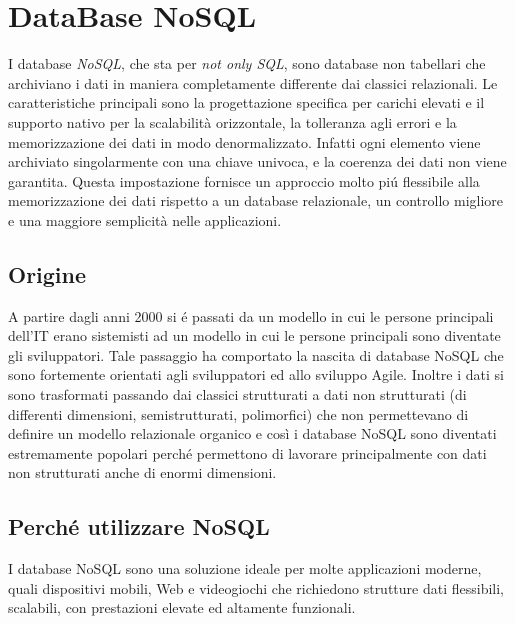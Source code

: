 \chapter{DataBase NoSQL}
I database \emph{NoSQL}, che sta per \emph{not only SQL}, sono database non tabellari che archiviano i dati
in maniera completamente differente dai classici relazionali.
Le caratteristiche principali sono la progettazione specifica per carichi elevati e il supporto nativo per la scalabilità
orizzontale, la tolleranza agli errori e la memorizzazione dei dati in modo denormalizzato.
Infatti ogni elemento viene archiviato singolarmente con una chiave univoca, e la coerenza dei dati non viene garantita.
Questa impostazione fornisce un approccio molto piú flessibile alla memorizzazione dei dati rispetto a un database
relazionale, un controllo migliore e una maggiore semplicità nelle applicazioni.

\section{Origine}
A partire dagli anni 2000 si é passati da un modello in cui le persone principali dell'IT erano sistemisti ad un modello
in cui le persone principali sono diventate gli sviluppatori. Tale passaggio ha comportato la nascita di database NoSQL
che sono fortemente orientati agli sviluppatori ed allo sviluppo Agile.
Inoltre i dati si sono trasformati passando dai classici strutturati a dati non strutturati (di differenti dimensioni,
semistrutturati, polimorfici) che non permettevano di definire un modello relazionale organico e così i database NoSQL sono
diventati estremamente popolari perché permettono di lavorare principalmente con dati non strutturati anche di enormi
dimensioni.

\section{Perché utilizzare NoSQL}
I database NoSQL sono una soluzione ideale per molte applicazioni moderne, quali dispositivi mobili, Web e videogiochi
che richiedono strutture dati flessibili, scalabili, con prestazioni elevate ed altamente funzionali.
